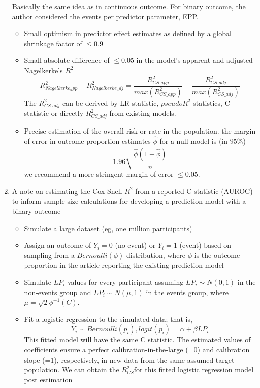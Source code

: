 \documentclass[
11pt, %
english, %
singlespacing, %
headsepline, %
]{MastersDoctoralThesis} %
\begin{document}
\begin{enumerate}
Basically the same idea as in continuous outcome. For binary outcome, the author considered the events per predictor parameter, EPP.  \begin{itemize}
\item Small optimism in predictor effect estimates as defined by a global shrinkage factor of $\le0.9$
\item Small absolute difference of $\le 0.05$ in the model's apparent and adjusted Nagelkerke's $R^2$
$$R^{2}_{Nagelkerke_app}-R^{2}_{Nagelkerke_adj} = \frac{R^{2}_{CS\_app}}{max(R^{2}_{CS\_app})}-\frac{R^{2}_{CS\_adj}}{max(R^{2}_{CS\_adj})}$$
The $R^{2}_{CS\_adj}$ can be derived by LR statistic,  $pseudo R^2$ statistics, C statistic or directly $R^{2}_{CS\_adj}$ from existing models.
\item Precise estimation of the overall risk or rate in the population.
the margin of error in outcome proportion estimates $\hat{\phi}$ for a null model is (in $95\%$)
$$1.96\sqrt{\frac{\hat{\phi}(1-\hat{\phi})}{n}}$$
we recommend a more stringent margin of error $\le 0.05$.

\end{itemize}
\item A note on estimating the Cox-Snell $R^2$ from a reported C-statistic (AUROC) to inform sample size calculations for developing a prediction model with a binary outcome

\begin{itemize}
\item Simulate a large dataset (eg, one million participants)
\item Assign an outcome of $Y_{i} =0$ (no event) or $Y_{i} =1$ (event) based on sampling from a $Bernoulli (\phi)$ distribution, where $\phi$ is the outcome proportion in the article reporting the existing prediction model
\item Simulate $LP_{i}$ values for every participant assuming ${LP}_{i} \sim N(0,1)$ in the non-events group and ${LP}_{i} \sim N(\mu,1)$ in the events group, where $\mu = \sqrt{2}\phi^{-1}(C)$.
\item Fit a logistic regression to the simulated data; that is,
$$Y_{i} \sim Bernoulli(p_i),
logit(p_{i}) = \alpha + \beta LP_{i}$$
This fitted model will have the same C statistic. The estimated values of coefficients ensure
a perfect calibration-in-the-large (=0) and calibration slope (=1), respectively, in new data from the same assumed target population. We can obtain the $R^{2}_{CS}$for this fitted logistic regression model post estimation


\end{itemize}
\end{enumerate}
\end{document}
